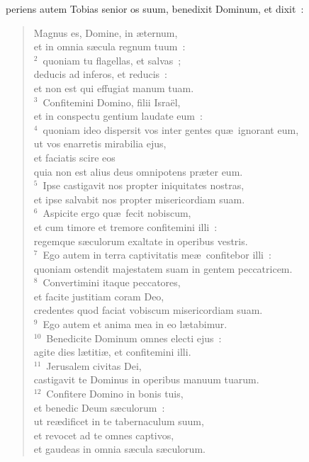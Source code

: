 \bchapter
{}periens autem Tobias senior os suum, benedixit Dominum, et dixit~: \begin{verse}\vspace{6pt}Magnus es, Domine, in \ae ternum,\\ et in omnia s\ae cula regnum tuum~:\\
${}^{2}$~quoniam tu flagellas, et salvas~;\\ deducis ad inferos, et reducis~:\\ et non est qui effugiat manum tuam.\\
${}^{3}$~Confitemini Domino, filii Isra\"el,\\ et in conspectu gentium laudate eum~:\\
${}^{4}$~quoniam ideo dispersit vos inter gentes qu\ae\ ignorant eum,\\ ut vos enarretis mirabilia ejus,\\ et faciatis scire eos\\ quia non est alius deus omnipotens pr\ae ter eum.\\
${}^{5}$~Ipse castigavit nos propter iniquitates nostras,\\ et ipse salvabit nos propter misericordiam suam.\\
${}^{6}$~Aspicite ergo qu\ae\ fecit nobiscum,\\ et cum timore et tremore confitemini illi~:\\ regemque s\ae culorum exaltate in operibus vestris.\\
${}^{7}$~Ego autem in terra captivitatis me\ae\ confitebor illi~:\\ quoniam ostendit majestatem suam in gentem peccatricem.\\
${}^{8}$~Convertimini itaque peccatores,\\ et facite justitiam coram Deo,\\ credentes quod faciat vobiscum misericordiam suam.\\
${}^{9}$~Ego autem et anima mea in eo l\ae tabimur.\\
${}^{10}$~Benedicite Dominum omnes electi ejus~:\\ agite dies l\ae titi\ae , et confitemini illi.\\
${}^{11}$~Jerusalem civitas Dei,\\ castigavit te Dominus in operibus manuum tuarum.\\
${}^{12}$~Confitere Domino in bonis tuis,\\ et benedic Deum s\ae culorum~:\\ ut re\ae dificet in te tabernaculum suum,\\ et revocet ad te omnes captivos,\\ et gaudeas in omnia s\ae cula s\ae culorum.\\

\end{verse}
